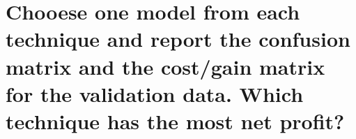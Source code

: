 \section{Chooese one model from each technique and report the confusion matrix and the cost/gain matrix for the validation data. Which technique has the most net profit?}